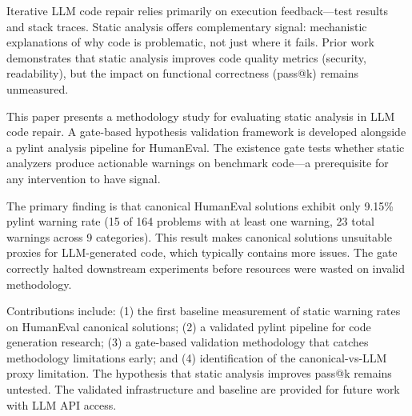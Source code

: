 
Iterative LLM code repair relies primarily on execution feedback---test results and stack traces. Static analysis offers complementary signal: mechanistic explanations of why code is problematic, not just where it fails. Prior work demonstrates that static analysis improves code quality metrics (security, readability), but the impact on functional correctness (pass@k) remains unmeasured.

This paper presents a methodology study for evaluating static analysis in LLM code repair. A gate-based hypothesis validation framework is developed alongside a pylint analysis pipeline for HumanEval. The existence gate tests whether static analyzers produce actionable warnings on benchmark code---a prerequisite for any intervention to have signal.

The primary finding is that canonical HumanEval solutions exhibit only 9.15\% pylint warning rate (15 of 164 problems with at least one warning, 23 total warnings across 9 categories). This result makes canonical solutions unsuitable proxies for LLM-generated code, which typically contains more issues. The gate correctly halted downstream experiments before resources were wasted on invalid methodology.

Contributions include: (1) the first baseline measurement of static warning rates on HumanEval canonical solutions; (2) a validated pylint pipeline for code generation research; (3) a gate-based validation methodology that catches methodology limitations early; and (4) identification of the canonical-vs-LLM proxy limitation. The hypothesis that static analysis improves pass@k remains untested. The validated infrastructure and baseline are provided for future work with LLM API access.
